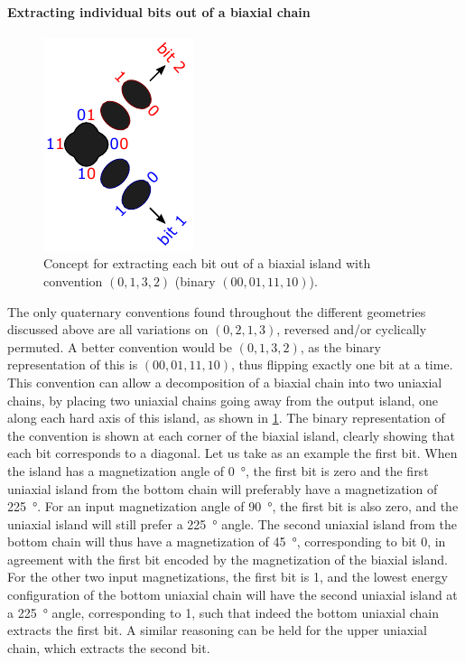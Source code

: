 \documentclass[11pt,a4paper,english,twoside]{article}
\begin{document}
\paragraph{Extracting individual bits out of a biaxial chain} %
\begin{figure}
    \centering
    \includegraphics[width=0.3\columnwidth]{Figures/Introduction/0132_biaxial_to_uniaxial.pdf}
    \caption{Concept for extracting each bit out of a biaxial island with convention $(0,1,3,2)$ (binary $(00,01,11,10)$).}
    \label{fig:halfadder_concept_0132_biaxial_to_uniaxial}
\end{figure}
The only quaternary conventions found throughout the different geometries discussed above are all variations on $(0,2,1,3)$, reversed and/or cyclically permuted.
A better convention would be $(0,1,3,2)$, as the binary representation of this is $(00, 01, 11, 10)$, thus flipping exactly one bit at a time. This convention can allow a decomposition of a biaxial chain into two uniaxial chains, by placing two uniaxial chains going away from the output island, one along each hard axis of this island, as shown in \cref{fig:halfadder_concept_0132_biaxial_to_uniaxial}. The binary representation of the convention is shown at each corner of the biaxial island, clearly showing that each bit corresponds to a diagonal. Let us take as an example the first bit. When the island has a magnetization angle of \SI{0}{\degree}, the first bit is zero and the first uniaxial island from the bottom chain will preferably have a magnetization of \SI{225}{\degree}. For an input magnetization angle of \SI{90}{\degree}, the first bit is also zero, and the uniaxial island will still prefer a \SI{225}{\degree} angle. The second uniaxial island from the bottom chain will thus have a magnetization of \SI{45}{\degree}, corresponding to bit 0, in agreement with the first bit encoded by the magnetization of the biaxial island. For the other two input magnetizations, the first bit is 1, and the lowest energy configuration of the bottom uniaxial chain will have the second uniaxial island at a \SI{225}{\degree} angle, corresponding to 1, such that indeed the bottom uniaxial chain extracts the first bit. A similar reasoning can be held for the upper uniaxial chain, which extracts the second bit. \par
\end{document}
